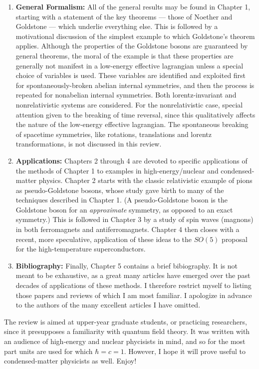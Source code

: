 \documentclass[12pt]{report}
\begin{document}
\begin{enumerate}
\item
{\bf General Formalism:}
All of the general results may be found in Chapter 1,
starting with a statement of the key theorems --- those of
Noether and Goldstone --- which underlie everything else.
This is followed by a motivational discussion of the
simplest example to which Goldstone's theorem applies.
Although the properties of the Goldstone bosons are
guaranteed by general theorems, the moral of the example is
that these properties are generally not manifest in a
low-energy effective lagrangian unless a special choice of
variables is used. These variables are identified and
exploited first for spontaneously-broken abelian internal
symmetries, and then the process is repeated for nonabelian
internal symmetries. Both lorentz-invariant and
nonrelativistic systems are considered. For the
nonrelativistic case, special attention given to the
breaking of time reversal, since this qualitatively affects
the nature of the low-energy effective lagrangian. The
spontaneous breaking of spacetime symmetries, like
rotations, translations and lorentz transformations, is not
discussed in this review.

\item
{\bf Applications:}
Chapters 2 through 4 are devoted to specific applications
of the methods of Chapter 1 to examples in
high-energy/nuclear and condensed-matter physics. Chapter 2
starts with the classic relativistic example of pions as
pseudo-Goldstone bosons, whose study gave birth to many of
the techniques described in Chapter 1. (A pseudo-Goldstone
boson is the Goldstone boson for an {\it approximate}
symmetry, as opposed to an exact symmetry.) This is
followed in Chapter 3 by a study of spin waves (magnons) in
both ferromagnets and antiferromagnets. Chapter 4 then
closes with a recent, more speculative, application of
these ideas to the $SO(5)$ proposal for the
high-temperature superconductors.

\item
{\bf Bibliography:}
Finally, Chapter 5 contains a brief bibiography. It is not
meant to be exhaustive, as a great many articles have
emerged over the past decades of applications of these
methods.  I therefore restrict myself to listing those
papers and reviews of which I am most familiar. I apologize
in advance to the authors of the many excellent  articles I
have omitted.
\end{enumerate}

The review is aimed at upper-year graduate students, or
practicing researchers, since it presupposes a familiarity
with quantum field theory. It was written with an
audience of high-energy and nuclear phycisists in mind, and
so for the most part units are used for which $\hbar = c =
1$. However, I hope it will prove useful to
condensed-matter physicists as well. Enjoy!
\end{document}
